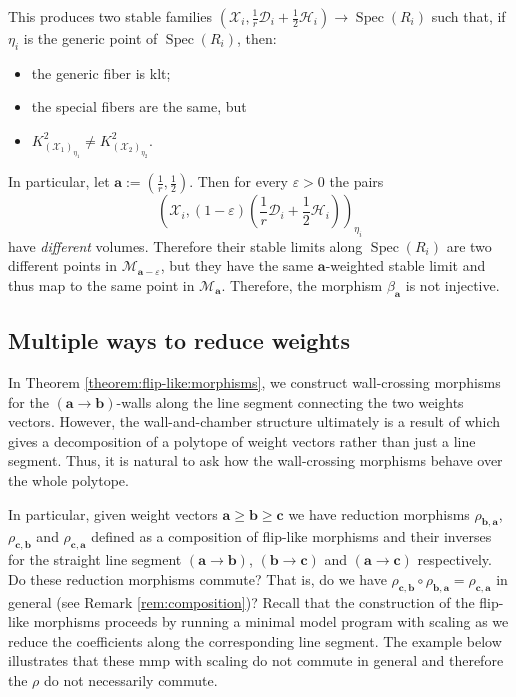 \documentclass[11pt]{amsart}
\theoremstyle{definition}
\theoremstyle{remark}
\newcommand{\calH}{\mathcal H}
\newcommand{\calX}{\mathcal X}
\newcommand{\calD}{\mathcal D}
\newcommand{\sM}{\mathscr{M}}
\newcommand{\Spec}{\operatorname{Spec}}
\newcommand{\bfa}{\mathbf{a}}
\newcommand{\bfb}{\mathbf{b}}
\newcommand{\bfc}{\mathbf{c}}
\begin{document}
	This produces two stable families $(\calX_i,\frac{1}{r}\calD_i+\frac{1}{2}\calH_i) \to  \Spec(R_i)$ such that, if $\eta_i$ is the generic point of $\Spec(R_i)$, then:
	\begin{itemize}
		\item the generic fiber is klt;
		\item the special fibers are the same, but
		\item $K_{(\calX_1)_{\eta_1}}^2 \neq K_{(\calX_2)_{\eta_2}}^2$.
	\end{itemize}
	In particular, let $\mathbf{a}:=(\frac{1}{r},\frac{1}{2})$. Then for every $\varepsilon >0$ the pairs
	$$(\calX_i,(1-\varepsilon)(\frac{1}{r}\calD_i+\frac{1}{2}\calH_i))_{\eta_i}$$ have \emph{different} volumes.
	Therefore their stable limits along $\Spec(R_i)$ are two different points in $\sM_{\mathbf{a}-\varepsilon}$, but they have the same $\bfa$-weighted stable limit and thus map to the same point in $\sM_{\mathbf{a}}$. Therefore, the morphism $\beta_{\mathbf{a}}$ is not injective.
	
	\subsection{Multiple ways to reduce weights}\label{section:line} 
	
	In Theorem \ref{theorem:flip-like:morphisms}, we construct wall-crossing morphisms for the $(\bfa \to \bfb)$-walls along the line segment connecting the two weights vectors. However, the wall-and-chamber structure ultimately is a result of \cite[Theorem E]{BCHM10} which gives a decomposition of a polytope of weight vectors rather than just a line segment. Thus, it is natural to ask how the wall-crossing morphisms behave over the whole polytope. 
	
	In particular, given weight vectors $\bfa \ge \bfb \ge \bfc$ we have reduction morphisms $\rho_{\bfb, \bfa}$, $\rho_{\bfc, \bfb}$ and $\rho_{\bfc, \bfa}$ defined as a composition of flip-like morphisms and their inverses for the straight line segment $(\bfa \to \bfb)$, $(\bfb \to \bfc)$ and $(\bfa \to \bfc)$ respectively. Do these reduction morphisms commute? That is, do we have $\rho_{\bfc, \bfb} \circ \rho_{\bfb, \bfa} = \rho_{\bfc, \bfa}$ in general (see Remark \ref{rem:composition})? Recall that the construction of the flip-like morphisms proceeds by running a minimal model program with scaling as we reduce the coefficients along the corresponding line segment. The example below illustrates that these mmp with scaling do not commute in general and therefore the $\rho$ do not necessarily commute. 
	
\end{document}
